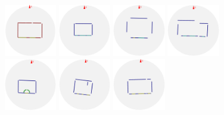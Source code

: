 \begin{figure}[t]
\begin{minipage}[c]{4.9in}
  \includegraphics[width=0.9in]{../gi2012_userstudy/images/section3/0_2D_walls_rotate_edit} %
  \includegraphics[width=0.9in]{../gi2012_userstudy/images/section3/6_2D_walls_rotate} %
  \includegraphics[width=0.9in]{../gi2012_userstudy/images/section3/7_2D_walls_rotate} %
  \includegraphics[width=0.9in]{../gi2012_userstudy/images/section3/8_2D_walls_rotate}\\ %
  \includegraphics[width=0.9in]{../gi2012_userstudy/images/section3/2_2D_walls_rotate} %
  \includegraphics[width=0.9in]{../gi2012_userstudy/images/section3/3_2D_walls_rotate} %
  \includegraphics[width=0.9in]{../gi2012_userstudy/images/section3/4_2D_walls_rotate} %

\end{minipage}
\end{figure}
